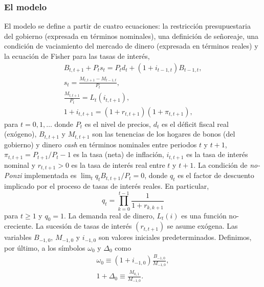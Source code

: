 \documentclass[../../entrega.tex]{subfiles}
\begin{document}
\subsubsection{El modelo}
El modelo se define a partir de cuatro ecuaciones: la restricción presupuestaria del gobierno (expresada en términos nominales), una definición de señoreaje, una condición de vaciamiento del mercado de dinero (expresada en términos reales) y la ecuación de Fisher para las tasas de interés,
\begin{gather}
    B _{t, t + 1} + P_t s_t = P_t d_t + (1 + i _{t - 1, t}) B _{t - 1, t},\\
    s_t = \frac{M _{t, t + 1} - M _{t - 1, t}}{P_t},\\
    \frac{M _{t, t + 1}}{P_t} = L_t(i _{t, t + 1}),\\
    1 + i _{t, t + 1} = (1 + r _{t, t + 1})(1 + \pi _{t, t + 1}),
\end{gather}
para $t = 0, 1, \ldots$ donde $P_t$ es el nivel de precios, $d_t$ es el déficit fiscal real (exógeno), $B _{t, t + 1}$ y $M _{t, t + 1}$ son las tenencias de los hogares de bonos (del gobierno) y dinero \emph{cash} en términos nominales entre periodos $t$ y $t + 1$, $\pi _{t, t + 1} = P _{t + 1} / P_t - 1$ es la tasa (neta) de inflación, $i _{t, t + 1}$ es la tasa de interés nominal y $r _{t, t + 1} > 0$ es la tasa de interés real entre $t$ y $t + 1$.
La condición de \emph{no-Ponzi} implementada es $\lim_t q_t B _{t, t + 1} / P_t = 0$, donde $q_t$ es el factor de descuento implicado por el proceso de tasas de interés reales. En particular,
\begin{equation*}
    q_t = \prod_{k=0}^{t-1} \frac{1}{1 + r_{k,k+1}}
\end{equation*}
para $t \geq 1$ y $q_0 = 1$.
La demanda real de dinero, $L_t(i)$ es una función no-creciente.
La sucesión de tasas de interés $(r _{t, t + 1})$ se asume exógena.
Las variables $B _{-1, 0}$, $M _{-1, 0}$ y $i _{-1, 0}$ son valores iniciales predeterminados.
Definimos, por último, a los símbolos $\omega_0$ y $\Delta_0$ como
\begin{gather}
    \omega_0 \equiv (1 + i_{-1, 0}) \frac{B_{-1, 0}}{M_{-1, 0}},\label{eq:1a-omega}\\
    1 + \Delta_0 \equiv \frac{M _{0, 1}}{M _{-1, 0}}\label{eq:1a-delta}.
\end{gather}
\end{document}
